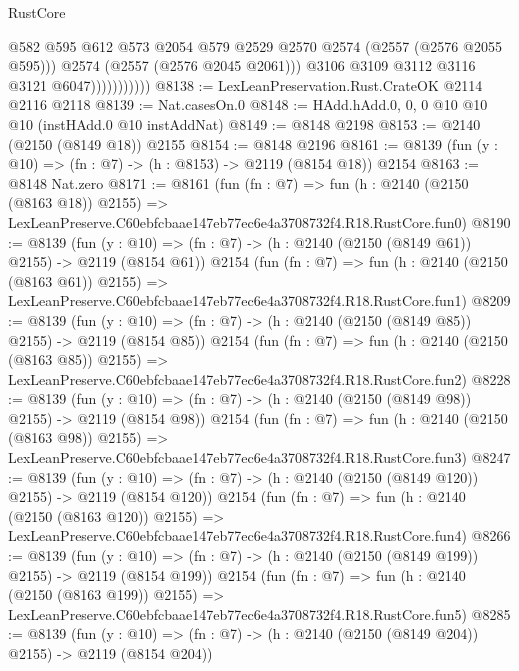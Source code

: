 \begin{lexlean}{RustCore}
\begin{coremodule}
                              @582
                              @595
                              @612
                              @573
                              @2054
                              @579
                              @2529
                              @2570
                              @2574
                              (@2557 (@2576 @2055 @595)))
                            @2574
                            (@2557 (@2576 @2045 @2061)))
                          @3106
                          @3109
                          @3112
                          @3116
                          @3121
                          @6047)))))))))))
@8138 := LexLeanPreservation.Rust.CrateOK @2114 @2116 @2118
@8139 := Nat.casesOn.{0}
@8148 := HAdd.hAdd.{0, 0, 0} @10 @10 @10 (instHAdd.{0} @10 instAddNat)
@8149 := @8148 @2198
@8153 := @2140 (@2150 (@8149 @18)) @2155
@8154 := @8148 @2196
@8161 := @8139 (fun (y : @10) => (fn : @7) -> (h : @8153) -> @2119 (@8154 @18)) @2154
@8163 := @8148 Nat.zero
@8171 := @8161
    (fun (fn : @7) =>
    fun (h : @2140 (@2150 (@8163 @18)) @2155) =>
    LexLeanPreserve.C60ebfcbaae147eb77ec6e4a3708732f4.R18.RustCore.fun0)
@8190 := @8139
    (fun (y : @10) => (fn : @7) -> (h : @2140 (@2150 (@8149 @61)) @2155) -> @2119 (@8154 @61))
    @2154
    (fun (fn : @7) =>
    fun (h : @2140 (@2150 (@8163 @61)) @2155) =>
    LexLeanPreserve.C60ebfcbaae147eb77ec6e4a3708732f4.R18.RustCore.fun1)
@8209 := @8139
    (fun (y : @10) => (fn : @7) -> (h : @2140 (@2150 (@8149 @85)) @2155) -> @2119 (@8154 @85))
    @2154
    (fun (fn : @7) =>
    fun (h : @2140 (@2150 (@8163 @85)) @2155) =>
    LexLeanPreserve.C60ebfcbaae147eb77ec6e4a3708732f4.R18.RustCore.fun2)
@8228 := @8139
    (fun (y : @10) => (fn : @7) -> (h : @2140 (@2150 (@8149 @98)) @2155) -> @2119 (@8154 @98))
    @2154
    (fun (fn : @7) =>
    fun (h : @2140 (@2150 (@8163 @98)) @2155) =>
    LexLeanPreserve.C60ebfcbaae147eb77ec6e4a3708732f4.R18.RustCore.fun3)
@8247 := @8139
    (fun (y : @10) => (fn : @7) -> (h : @2140 (@2150 (@8149 @120)) @2155) -> @2119 (@8154 @120))
    @2154
    (fun (fn : @7) =>
    fun (h : @2140 (@2150 (@8163 @120)) @2155) =>
    LexLeanPreserve.C60ebfcbaae147eb77ec6e4a3708732f4.R18.RustCore.fun4)
@8266 := @8139
    (fun (y : @10) => (fn : @7) -> (h : @2140 (@2150 (@8149 @199)) @2155) -> @2119 (@8154 @199))
    @2154
    (fun (fn : @7) =>
    fun (h : @2140 (@2150 (@8163 @199)) @2155) =>
    LexLeanPreserve.C60ebfcbaae147eb77ec6e4a3708732f4.R18.RustCore.fun5)
@8285 := @8139
    (fun (y : @10) => (fn : @7) -> (h : @2140 (@2150 (@8149 @204)) @2155) -> @2119 (@8154 @204))

\end{coremodule}
\end{lexlean}
